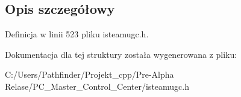 \subsection{Opis szczegółowy}


Definicja w linii 523 pliku isteamugc.\+h.



Dokumentacja dla tej struktury została wygenerowana z pliku\+:\begin{DoxyCompactItemize}
\item 
C\+:/\+Users/\+Pathfinder/\+Projekt\+\_\+cpp/\+Pre-\/\+Alpha Relase/\+P\+C\+\_\+\+Master\+\_\+\+Control\+\_\+\+Center/isteamugc.\+h\end{DoxyCompactItemize}
